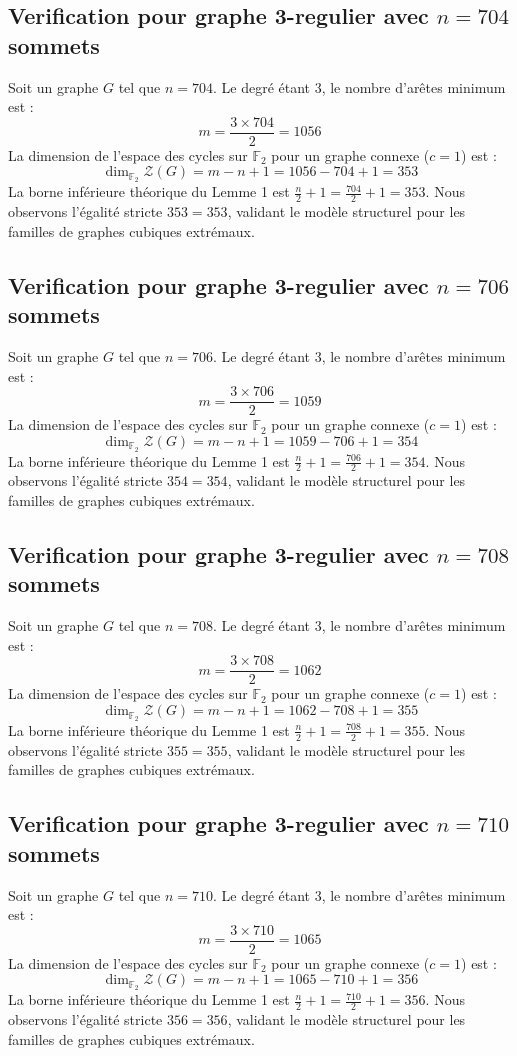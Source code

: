 \documentclass[11pt,a4paper]{article}
\begin{document}
\subsection{Verification pour graphe 3-regulier avec $n=704$ sommets}
Soit un graphe $G$ tel que $n = 704$. Le degré étant 3, le nombre d'arêtes minimum est :
$$ m = \frac{3 \times 704}{2} = 1056 $$
La dimension de l'espace des cycles sur $\mathbb{F}_2$ pour un graphe connexe ($c=1$) est :
$$ \dim_{\mathbb{F}_2} \mathcal{Z}(G) = m - n + 1 = 1056 - 704 + 1 = 353 $$
La borne inférieure théorique du Lemme 1 est $\frac{n}{2} + 1 = \frac{704}{2} + 1 = 353$.
Nous observons l'égalité stricte $353 = 353$, validant le modèle structurel pour les familles de graphes cubiques extrémaux.

\subsection{Verification pour graphe 3-regulier avec $n=706$ sommets}
Soit un graphe $G$ tel que $n = 706$. Le degré étant 3, le nombre d'arêtes minimum est :
$$ m = \frac{3 \times 706}{2} = 1059 $$
La dimension de l'espace des cycles sur $\mathbb{F}_2$ pour un graphe connexe ($c=1$) est :
$$ \dim_{\mathbb{F}_2} \mathcal{Z}(G) = m - n + 1 = 1059 - 706 + 1 = 354 $$
La borne inférieure théorique du Lemme 1 est $\frac{n}{2} + 1 = \frac{706}{2} + 1 = 354$.
Nous observons l'égalité stricte $354 = 354$, validant le modèle structurel pour les familles de graphes cubiques extrémaux.

\subsection{Verification pour graphe 3-regulier avec $n=708$ sommets}
Soit un graphe $G$ tel que $n = 708$. Le degré étant 3, le nombre d'arêtes minimum est :
$$ m = \frac{3 \times 708}{2} = 1062 $$
La dimension de l'espace des cycles sur $\mathbb{F}_2$ pour un graphe connexe ($c=1$) est :
$$ \dim_{\mathbb{F}_2} \mathcal{Z}(G) = m - n + 1 = 1062 - 708 + 1 = 355 $$
La borne inférieure théorique du Lemme 1 est $\frac{n}{2} + 1 = \frac{708}{2} + 1 = 355$.
Nous observons l'égalité stricte $355 = 355$, validant le modèle structurel pour les familles de graphes cubiques extrémaux.

\subsection{Verification pour graphe 3-regulier avec $n=710$ sommets}
Soit un graphe $G$ tel que $n = 710$. Le degré étant 3, le nombre d'arêtes minimum est :
$$ m = \frac{3 \times 710}{2} = 1065 $$
La dimension de l'espace des cycles sur $\mathbb{F}_2$ pour un graphe connexe ($c=1$) est :
$$ \dim_{\mathbb{F}_2} \mathcal{Z}(G) = m - n + 1 = 1065 - 710 + 1 = 356 $$
La borne inférieure théorique du Lemme 1 est $\frac{n}{2} + 1 = \frac{710}{2} + 1 = 356$.
Nous observons l'égalité stricte $356 = 356$, validant le modèle structurel pour les familles de graphes cubiques extrémaux.
\end{document}
